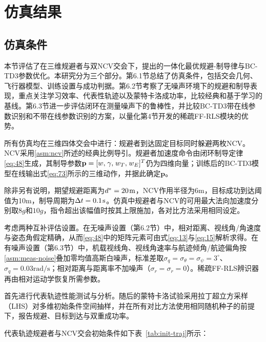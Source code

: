 \section{仿真结果}
\subsection{仿真条件}
本节评估了在三维规避者与双NCV交会下，提出的一体化最优规避-制导律与BC-TD3参数优化。本研究分为三个部分。第6.1节总结了仿真条件，包括交会几何、飞行器模型、训练设置与成功判据。第6.2节考察了无噪声环境下的规避和制导表现，重点关注学习效率、代表性轨迹以及蒙特卡洛成功率，比较经典和基于学习的基线。第6.3节进一步评估闭环在测量噪声下的鲁棒性，并比较BC-TD3带在线参数识别和不带在线参数识别的方案，以量化第4节开发的稀疏FF-RLS模块的优势。

所有仿真均在三维四体交会中进行：规避者到达固定目标同时躲避两枚NCV。NCV采用\cref{asm:ncv}所述的经典比例导引。规避者加速度命令由闭环制导定律\eqref{eq:48}生成，其制导参数${\mathbf{p}} = {[w,{\kern 1pt} \gamma ,{\kern 1pt} {w_T},{\kern 1pt} {w_E}]^T}$仍为四维向量；训练后的BC-TD3模型在线输出式\eqref{eq:73}所示的三维动作，并据此确定${\mathbf{p}}$。

除非另有说明，期望规避距离为${d^*} = 20{\kern 1pt} {\text{m}}$，NCV作用半径为6m，目标成功到达阈值为10m，制导周期为$\Delta t = 0.1{\kern 1pt} {\text{s}}$。仿真中规避者与NCV的可用最大法向加速度分别取$8g$和$10g$，指令超出该幅值时按其上限施加，各对比方法采用相同设定。

考虑两种互补评估设置。在无噪声设置（第6.2节）中，相对距离、视线角/角速度与姿态角假定精确，从而\eqref{eq:48}中的矩阵元素可由式\eqref{eq:13}与\eqref{eq:15}解析求得。在有噪声设置（第6.3节）中，机载视线角、视线角速率与航迹倾角/航迹偏角按\cref{asm:meas-noise}叠加零均值高斯白噪声，标准差取${\sigma _q} = {\sigma _\theta } = {\sigma _\psi } = {3^ \circ }$、${\sigma _{\dot q}} = 0.03{\text{rad/s}}$；相对距离与距离率不加噪声（${\sigma _r} = {\sigma _{\dot r}} = 0$）。稀疏FF-RLS辨识器再由相对运动学恢复所需参数。

首先进行代表轨迹性能测试与分析。随后的蒙特卡洛试验采用拉丁超立方采样（LHS）对多维初始条件空间抽样，并在所有对比方法使用相同随机种子的前提下，报告规避、目标到达与双重成功率。

代表轨迹规避者与NCV交会初始条件如下表~\ref{tab:init-traj}所示：

